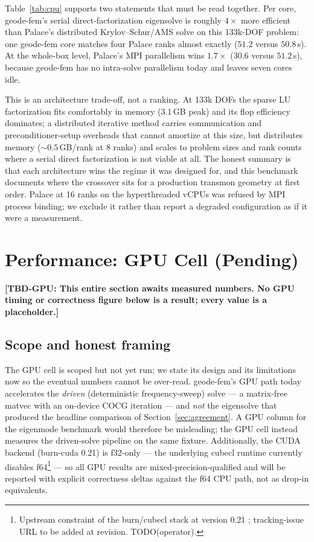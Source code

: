 \documentclass{anvil-paper}
\newcommand{\TBDGPU}[1]{\textcolor{red!75!black}{\textbf{[TBD-GPU: #1]}}}
\begin{document}
Table~\ref{tab:cpu} supports two statements that must be read together.
Per core, geode-fem's serial direct-factorization eigensolve is roughly
$4\times$ more efficient than Palace's distributed Krylov--Schur/AMS solve
on this 133k-DOF problem: one geode-fem core matches four Palace ranks
almost exactly ($51.2$ versus $50.8$\,s). At the whole-box level, Palace's
MPI parallelism wins $1.7\times$ ($30.6$ versus $51.2$\,s), because
geode-fem has no intra-solve parallelism today and leaves seven cores
idle.

This is an architecture trade-off, not a ranking. At 133k DOFs the sparse
LU factorization fits comfortably in memory (3.1\,GB peak) and its flop
efficiency dominates; a distributed iterative method carries communication
and preconditioner-setup overheads that cannot amortize at this size, but
distributes memory (${\sim}0.5$\,GB/rank at 8 ranks) and scales to problem
sizes and rank counts where a serial direct factorization is not viable at
all. The honest summary is that each architecture wins the regime it was
designed for, and this benchmark documents where the crossover sits for a
production transmon geometry at first order. Palace at 16 ranks on the
hyperthreaded vCPUs was refused by MPI process binding; we exclude it
rather than report a degraded configuration as if it were a measurement.

\section{Performance: GPU Cell (Pending)}
\label{sec:perf-gpu}

\TBDGPU{This entire section awaits measured numbers. No GPU timing or
correctness figure below is a result; every value is a placeholder.}

\subsection{Scope and honest framing}

The GPU cell is scoped but not yet run; we state its design and its
limitations now so the eventual numbers cannot be over-read. geode-fem's
GPU path today accelerates the \emph{driven} (deterministic
frequency-sweep) solve --- a matrix-free matvec with an on-device COCG
iteration --- and \emph{not} the eigensolve that produced the headline
comparison of Section~\ref{sec:agreement}. A GPU column for the eigenmode
benchmark would therefore be misleading; the GPU cell instead measures the
driven-solve pipeline on the same fixture. Additionally, the CUDA backend
(burn-cuda 0.21) is f32-only --- the underlying cubecl runtime currently
disables f64\footnote{Upstream constraint of the burn/cubecl stack at
version 0.21 \citep{burn}; tracking-issue URL to be added at revision.
TODO(operator).} --- so all GPU results are mixed-precision-qualified and
will be reported with explicit correctness deltas against the f64 CPU
path, not as drop-in equivalents.
\end{document}
